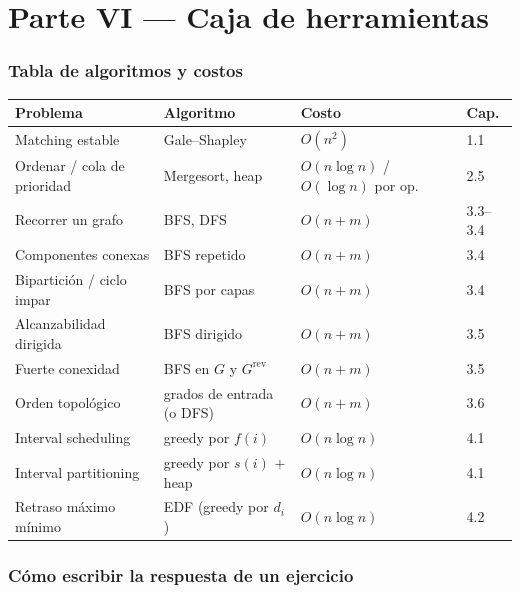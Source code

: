 \documentclass[11pt,a4paper]{article}
\theoremstyle{plain}
\theoremstyle{definition}
\theoremstyle{remark}
\begin{document}
\part*{Parte VI --- Caja de herramientas}

\section{Tabla de algoritmos y costos}

\begin{center}\small
\begin{tabular}{@{}llll@{}}
\toprule
\textbf{Problema} & \textbf{Algoritmo} & \textbf{Costo} & \textbf{Cap.} \\
\midrule
Matching estable & Gale--Shapley & $O(n^2)$ & 1.1 \\
Ordenar / cola de prioridad & Mergesort, heap & $O(n\log n)$ / $O(\log n)$ por op. & 2.5 \\
Recorrer un grafo & BFS, DFS & $O(n+m)$ & 3.3--3.4 \\
Componentes conexas & BFS repetido & $O(n+m)$ & 3.4 \\
Bipartición / ciclo impar & BFS por capas & $O(n+m)$ & 3.4 \\
Alcanzabilidad dirigida & BFS dirigido & $O(n+m)$ & 3.5 \\
Fuerte conexidad & BFS en $G$ y $G^{\mathrm{rev}}$ & $O(n+m)$ & 3.5 \\
Orden topológico & grados de entrada (o DFS) & $O(n+m)$ & 3.6 \\
Interval scheduling & greedy por $f(i)$ & $O(n\log n)$ & 4.1 \\
Interval partitioning & greedy por $s(i)$ $+$ heap & $O(n\log n)$ & 4.1 \\
Retraso máximo mínimo & EDF (greedy por $d_i$) & $O(n\log n)$ & 4.2 \\
\bottomrule
\end{tabular}
\end{center}

\section{Cómo escribir la respuesta de un ejercicio}
\end{document}
